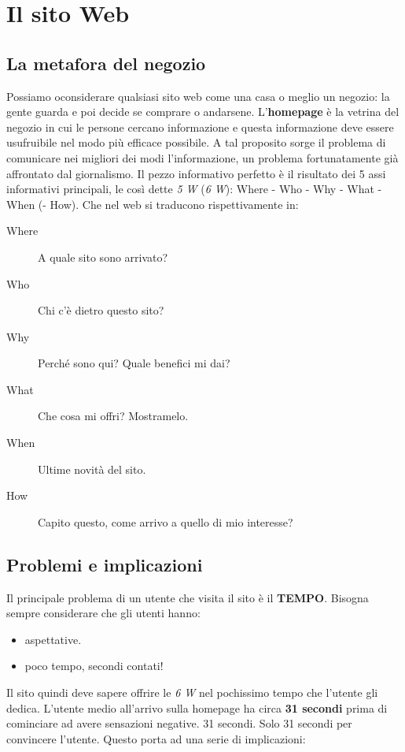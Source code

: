 
\section{Il sito Web}

	\subsection{La metafora del negozio}
		Possiamo oconsiderare qualsiasi sito web come una casa o meglio un negozio: la gente guarda e poi decide se comprare o andarsene.
		L'\textbf{homepage} è la vetrina del negozio in cui le persone cercano informazione e questa informazione deve essere usufruibile nel modo più efficace possibile. A tal proposito sorge il problema di comunicare nei migliori dei modi l'informazione, un problema fortunatamente già affrontato dal giornalismo. Il pezzo informativo perfetto è il risultato dei 5 assi informativi principali, le così dette \emph{5 W} (\emph{6 W}): Where - Who - Why - What - When (- How).
		Che nel web si traducono rispettivamente in:
		\begin{description}
			\item[Where] A quale sito sono arrivato?
			\item[Who] Chi c'è dietro questo sito?
			\item[Why] Perché sono qui? Quale benefici mi dai?
			\item[What] Che cosa mi offri? Mostramelo.
			\item[When] Ultime novità del sito.
			\item[How] Capito questo, come arrivo a quello di mio interesse?
		\end{description}
	
	\subsection{Problemi e implicazioni}
		Il principale problema di un utente che visita il sito è il \textbf{TEMPO}. Bisogna sempre considerare che gli utenti hanno:
			\begin{itemize}
				\item aspettative.
				\item poco tempo, secondi contati!
			\end{itemize}
		Il sito quindi deve sapere offrire le \emph{6 W} nel pochissimo tempo che l'utente gli dedica.	L'utente medio all'arrivo sulla homepage ha circa \textbf{31 secondi} prima di cominciare ad avere sensazioni negative. 31 secondi. Solo 31 secondi per convincere l'utente. Questo porta ad una serie di implicazioni:
		
